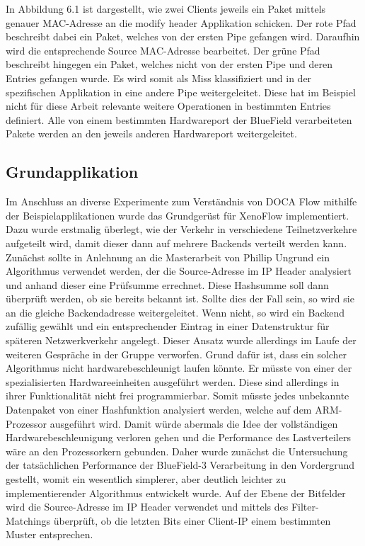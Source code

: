 In Abbildung 6.1 ist dargestellt, wie zwei Clients jeweils ein Paket mittels genauer MAC-Adresse an die modify header Applikation schicken. Der rote Pfad beschreibt dabei ein Paket, welches von der ersten Pipe gefangen wird. Daraufhin wird die entsprechende Source MAC-Adresse bearbeitet. Der grüne Pfad beschreibt hingegen ein Paket, welches nicht von der ersten Pipe und deren Entries gefangen wurde. Es wird somit als Miss klassifiziert und in der spezifischen Applikation in eine andere Pipe weitergeleitet. Diese hat im Beispiel nicht für diese Arbeit relevante weitere Operationen in bestimmten Entries definiert. Alle von einem bestimmten Hardwareport der BlueField verarbeiteten Pakete werden an den jeweils anderen Hardwareport weitergeleitet.
\subsection{Grundapplikation}
Im Anschluss an diverse Experimente zum Verständnis von DOCA Flow mithilfe der Beispielapplikationen wurde das Grundgerüst für XenoFlow implementiert. Dazu wurde erstmalig überlegt, wie der Verkehr in verschiedene Teilnetzverkehre aufgeteilt wird, damit dieser dann auf mehrere Backends verteilt werden kann. Zunächst sollte in Anlehnung an die Masterarbeit von Phillip Ungrund ein Algorithmus verwendet werden, der die Source-Adresse im IP Header analysiert und anhand dieser eine Prüfsumme errechnet. Diese Hashsumme soll dann überprüft werden, ob sie bereits bekannt ist. Sollte dies der Fall sein, so wird sie an die gleiche Backendadresse weitergeleitet. Wenn nicht, so wird ein Backend zufällig gewählt und ein entsprechender Eintrag in einer Datenstruktur für späteren Netzwerkverkehr angelegt. Dieser Ansatz wurde allerdings im Laufe der weiteren Gespräche in der Gruppe verworfen. Grund dafür ist, dass ein solcher Algorithmus nicht hardwarebeschleunigt laufen könnte. Er müsste von einer der spezialisierten Hardwareeinheiten ausgeführt werden. Diese sind allerdings in ihrer Funktionalität nicht frei programmierbar. Somit müsste jedes unbekannte Datenpaket von einer Hashfunktion analysiert werden, welche auf dem ARM-Prozessor ausgeführt wird. Damit würde abermals die Idee der vollständigen Hardwarebeschleunigung verloren gehen und die Performance des Lastverteilers wäre an den Prozessorkern gebunden. Daher wurde zunächst die Untersuchung der tatsächlichen Performance der BlueField-3 Verarbeitung in den Vordergrund gestellt, womit ein wesentlich simplerer, aber deutlich leichter zu implementierender Algorithmus entwickelt wurde. Auf der Ebene der Bitfelder wird die Source-Adresse im IP Header verwendet und mittels des Filter-Matchings überprüft, ob die letzten Bits einer Client-IP einem bestimmten Muster entsprechen.
